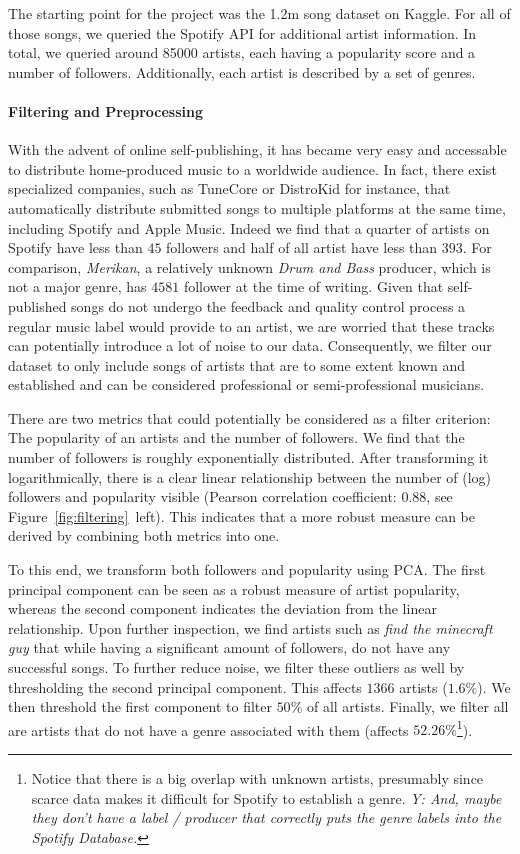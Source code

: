 \documentclass{article}
\newcommand{\todo}[1]{{\color{red} #1}}
\begin{document}
The starting point for the project was the 1.2m song dataset on Kaggle. For all of those songs, we queried the Spotify API for additional artist information. In total, we queried around \num[]{85 000} artists, each having a popularity score and a number of followers. Additionally, each artist is described by a set of genres.

\paragraph{Filtering and Preprocessing}
With the advent of online self-publishing, it has became very easy and accessable to distribute home-produced music to a worldwide audience. In fact, there exist specialized companies, such as TuneCore or DistroKid for instance, that automatically distribute submitted songs to multiple platforms at the same time, including Spotify and Apple Music. Indeed we find that a quarter of artists on Spotify have less than $45$ followers and half of all artist have less than $393$. For comparison, \emph{Merikan}, a relatively unknown \emph{Drum and Bass} producer, which is not a major genre, has $4581$ follower at the time of writing. Given that self-published songs do not undergo the feedback and quality control process a regular music label would provide to an artist, we are worried that these tracks can potentially introduce a lot of noise to our data. Consequently, we filter our dataset to only include songs of artists that are to some extent known and established and can be considered professional or semi-professional musicians.

There are two metrics that could potentially be considered as a filter criterion: The popularity of an artists and the number of followers. We find that the number of followers is roughly exponentially distributed. After transforming it logarithmically, there is a clear linear relationship between the number of (log) followers and popularity visible (Pearson correlation coefficient: $0.88$, see Figure~\ref{fig:filtering}~left). This indicates that a more robust measure can be derived by combining both metrics into one.

To this end, we transform both followers and popularity using PCA. The first principal component can be seen as a robust measure of artist popularity, whereas the second component indicates the deviation from the linear relationship. Upon further inspection, we find artists such as \emph{\todo{find the minecraft guy}} that while having a significant amount of followers, do not have any successful songs. To further reduce noise, we filter these outliers as well by thresholding the second principal component. This affects $1366$ artists ($1.6\%$). We then threshold the first component to filter $50\%$ of all artists. Finally, we filter all are artists that do not have a genre associated with them (affects $52.26\%$\footnote{Notice that there is a big overlap with unknown artists, presumably since scarce data makes it difficult for Spotify to establish a genre. \textit{Y: And, maybe they don't have a label / producer that correctly puts the genre labels into the Spotify Database.}}).
\end{document}

